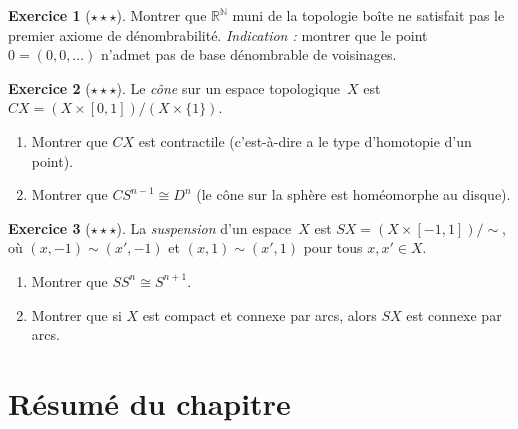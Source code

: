 \documentclass[12pt,a4paper,openany]{book}
\theoremstyle{definition}
\theoremstyle{cours}
\theoremstyle{coursnormal}
\newtheorem{exercice}{Exercice}[chapter]
\begin{document}
\begin{exercice}[$\star\star\star$]
\label{exo:boite-pas-premier-denombrable}
Montrer que $\mathbb{R}^{\mathbb{N}}$ muni de la topologie boîte ne satisfait pas
le premier axiome de dénombrabilité.
\emph{Indication :} montrer que le point $0 = (0, 0, \ldots)$ n'admet pas de base
dénombrable de voisinages.
\end{exercice}

\begin{exercice}[$\star\star\star$]
\label{exo:cone}
Le \emph{cône} sur un espace topologique~$X$ est $CX = (X \times [0,1]) / (X \times \{1\})$.
\begin{enumerate}[label=(\alph*)]
  \item Montrer que $CX$ est contractile (c'est-à-dire a le type d'homotopie d'un
        point).
  \item Montrer que $CS^{n-1} \cong D^n$ (le cône sur la sphère est homéomorphe
        au disque).
\end{enumerate}
\end{exercice}

\begin{exercice}[$\star\star\star$]
\label{exo:suspension}
La \emph{suspension} d'un espace~$X$ est $SX = (X \times [-1,1]) / {\sim}$, où
$(x,-1) \sim (x',-1)$ et $(x,1) \sim (x',1)$ pour tous $x, x' \in X$.
\begin{enumerate}[label=(\alph*)]
  \item Montrer que $SS^n \cong S^{n+1}$.
  \item Montrer que si $X$ est compact et connexe par arcs, alors $SX$ est
        connexe par arcs.
\end{enumerate}
\end{exercice}

\section*{Résumé du chapitre~\thechapter}
\end{document}
